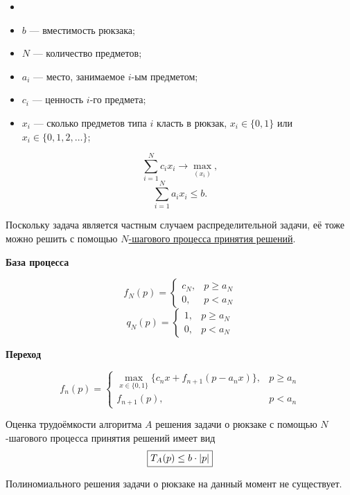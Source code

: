 \mathmodel

\begin{itemize}[nosep]
	\item[]
	
	\item $b$ --- вместимость рюкзака;
	
	\item $N$ --- количество предметов;
	
	\item $a_i$ --- место, занимаемое $i$-ым предметом;
	
	\item $c_i$ --- ценность $i$-го предмета;
	
	\item $x_i$ --- сколько предметов типа $i$ класть в рюкзак, $x_i \in \{0, 1\}$ или $x_i \in \{0, 1, 2, \dots\}$;
\end{itemize}

\[
\sum_{i=1}^N c_i x_i \to \max_{(x_i)},
\]
\[
\sum_{i=1}^N a_i x_i \le b.
\]


Поскольку задача является частным случаем распределительной задачи, её тоже можно решить с помощью \hyperref[def:n_step_process]{$N$-шагового процесса принятия решений}.

\textbf{База процесса}

\[
f_N(p) = \begin{cases}
	c_N,& p \ge a_N \\
	0,& p < a_N
\end{cases}
\]
\[
q_N(p) = \begin{cases}
	1,& p \ge a_N \\
	0,& p < a_N
\end{cases}
\]

\bigskip

\textbf{Переход}

\[
f_n(p) = \begin{cases}
	\max\limits_{x \in \{0, 1\}} \{c_n x + f_{n+1}(p - a_n x)\},& p \ge a_n \\
	f_{n+1}(p),& p < a_n
\end{cases}
\]

\fact

Оценка трудоёмкости алгоритма $A$ решения задачи о рюкзаке с помощью $N$-шагового процесса принятия решений имеет вид
\[
\boxed{T_A(p) \le b \cdot \abs{p}}
\]

\remark

Полиномиального решения задачи о рюкзаке на данный момент не существует.

